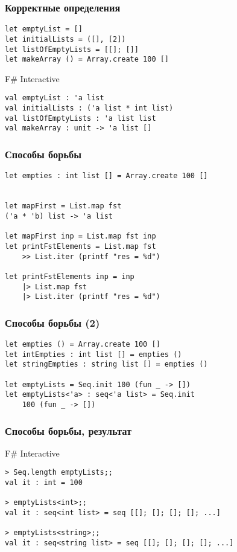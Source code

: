 \documentclass[xetex,mathserif,serif]{beamer}
\begin{document}
	\begin{frame}[fragile]
		\frametitle{Корректные определения}
		\begin{verbatim}
let emptyList = []
let initialLists = ([], [2])
let listOfEmptyLists = [[]; []]
let makeArray () = Array.create 100 []
		\end{verbatim}
		
		\begin{alertblock}{F\# Interactive}
			\begin{verbatim}
val emptyList : 'a list
val initialLists : ('a list * int list)
val listOfEmptyLists : 'a list list
val makeArray : unit -> 'a list []
			\end{verbatim}
		\end{alertblock}
	\end{frame}

	\begin{frame}[fragile]
		\frametitle{Способы борьбы}
		\begin{verbatim}
let empties : int list [] = Array.create 100 []


let mapFirst = List.map fst
('a * 'b) list -> 'a list

let mapFirst inp = List.map fst inp
let printFstElements = List.map fst
    >> List.iter (printf "res = %d")

let printFstElements inp = inp
    |> List.map fst
    |> List.iter (printf "res = %d")
		\end{verbatim}
	\end{frame}

	\begin{frame}[fragile]
		\frametitle{Способы борьбы (2)}
		\begin{verbatim}
let empties () = Array.create 100 []
let intEmpties : int list [] = empties ()
let stringEmpties : string list [] = empties ()

let emptyLists = Seq.init 100 (fun _ -> [])
let emptyLists<'a> : seq<'a list> = Seq.init 
    100 (fun _ -> [])
		\end{verbatim}
	\end{frame}

	\begin{frame}[fragile]
		\frametitle{Способы борьбы, результат}
		\begin{alertblock}{F\# Interactive}
			\begin{verbatim}
> Seq.length emptyLists;;
val it : int = 100

> emptyLists<int>;;
val it : seq<int list> = seq [[]; []; []; []; ...]

> emptyLists<string>;;
val it : seq<string list> = seq [[]; []; []; []; ...]
			\end{verbatim}
		\end{alertblock}
	\end{frame}
\end{document}
